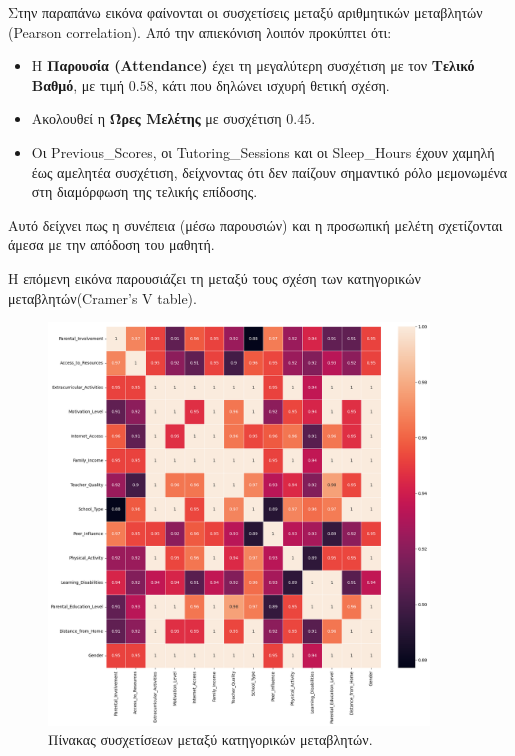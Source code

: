 \documentclass[12pt]{article}
\begin{document}
\noindent Στην παραπάνω εικόνα φαίνονται οι συσχετίσεις μεταξύ αριθμητικών μεταβλητών (Pearson correlation). Από την απιεκόνιση λοιπόν προκύπτει ότι:
\begin{itemize}
    \item Η \textbf{Παρουσία (Attendance)} έχει τη μεγαλύτερη συσχέτιση με τον \textbf{Τελικό Βαθμό}, με τιμή $0.58$, κάτι που δηλώνει ισχυρή θετική σχέση.
    \item Ακολουθεί η \textbf{Ώρες Μελέτης } με συσχέτιση $0.45$.
    \item Οι Previous\_Scores, οι Tutoring\_Sessions και οι Sleep\_Hours έχουν χαμηλή έως αμελητέα συσχέτιση, δείχνοντας ότι δεν παίζουν σημαντικό ρόλο μεμονωμένα στη διαμόρφωση της τελικής επίδοσης.
\end{itemize}

\noindent Αυτό δείχνει πως η συνέπεια (μέσω παρουσιών) και η προσωπική μελέτη σχετίζονται άμεσα με την απόδοση του μαθητή.

\noindent Η επόμενη εικόνα παρουσιάζει τη μεταξύ τους σχέση των κατηγορικών μεταβλητών(Cramer's V table).

\begin{figure}
    \centering 
    \includegraphics[width=0.9\textwidth]{./images/categorical_relation.png}
    \caption{Πίνακας συσχετίσεων μεταξύ κατηγορικών μεταβλητών.}
    \label{fig:categorical_corr}
    
\end{figure}
\end{document}
